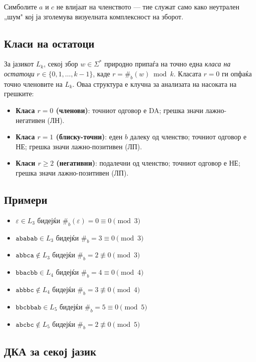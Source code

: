\documentclass[12pt,a4paper]{article}
\theoremstyle{definition}
\begin{document}
Симболите $a$ и $c$ не влијаат на членството --- тие служат само како неутрален „шум" кој ја зголемува визуелната комплексност на зборот.

\subsection{Класи на остатоци}

За јазикот $L_k$, секој збор $w \in \Sigma^*$ природно припаѓа на точно една \textit{класа на остатоци} $r \in \{0, 1, \ldots, k-1\}$, каде $r = \#_b(w) \bmod k$. Класата $r=0$ ги опфаќа точно членовите на $L_k$. Оваа структура е клучна за анализата на насоката на грешките:

\begin{itemize}
  \item \textbf{Класа $r=0$ (членови)}: точниот одговор е DA; грешка значи лажно-негативен (ЛН).
  \item \textbf{Класа $r=1$ (блиску-точни)}: еден $b$ далеку од членство; точниот одговор е НЕ; грешка значи лажно-позитивен (ЛП).
  \item \textbf{Класи $r \geq 2$ (негативни)}: подалечни од членство; точниот одговор е НЕ; грешка значи лажно-позитивен (ЛП).
\end{itemize}

\subsection{Примери}

\begin{itemize}
  \item $\varepsilon \in L_3$ бидејќи $\#_b(\varepsilon) = 0 \equiv 0 \pmod{3}$
  \item $\texttt{ababab} \in L_3$ бидејќи $\#_b = 3 \equiv 0 \pmod{3}$
  \item $\texttt{abbca} \notin L_3$ бидејќи $\#_b = 2 \not\equiv 0 \pmod{3}$
  \item $\texttt{bbacbb} \in L_4$ бидејќи $\#_b = 4 \equiv 0 \pmod{4}$
  \item $\texttt{abbbc} \notin L_4$ бидејќи $\#_b = 3 \not\equiv 0 \pmod{4}$
  \item $\texttt{bbcbbab} \in L_5$ бидејќи $\#_b = 5 \equiv 0 \pmod{5}$
  \item $\texttt{abcbc} \notin L_5$ бидејќи $\#_b = 2 \not\equiv 0 \pmod{5}$
\end{itemize}

\subsection{ДКА за секој јазик}
\end{document}

